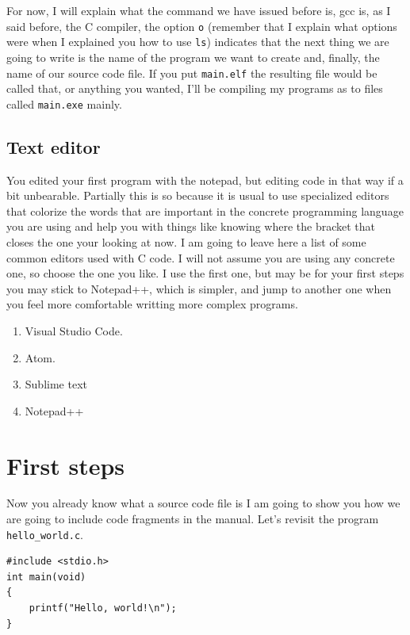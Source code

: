 \documentclass[a4paper]{article}
\begin{document}
For now, I will explain what the command we have issued before is, gcc is, as
I said before, the C compiler, the option \verb!o! (remember that I explain
what options were when I explained you how to use \verb!ls!) indicates that the
next thing we are going to write is the name of the program we want to create
and, finally, the name of our source code file. If you put \verb!main.elf! the
resulting file would be called that, or anything you wanted, I'll be compiling
my programs as to files called \verb!main.exe! mainly.

\subsection{Text editor}
You edited your first program with the notepad, but editing code in that way
if a bit unbearable. Partially this is so because it is usual to use specialized
editors that colorize the words that are important in the concrete programming
language you are using and help you with things like knowing where the bracket
that closes the one your looking at now. I am going to leave here a list of
some common editors used with C code. I will not assume you are using any
concrete one, so choose the one you like. I use the first one, but may be for
your first steps you may stick to Notepad++, which is simpler, and jump
to another one when you feel more comfortable writting more complex programs.
\begin{enumerate}
    \item Visual Studio Code.
    \item Atom.
    \item Sublime text
    \item Notepad++
\end{enumerate}

\section{First steps}

Now you already know what a source code file is I am going to show you how we
are going to include code fragments in the manual. Let's revisit the program
\verb!hello_world.c!.

\noindent
\begin{minipage}[H]{\linewidth}
\mbox{}
\begin{lstlisting}[style=C, caption={Hello World in C},
label={lst:helloWorld}]
#include <stdio.h>
int main(void)
{
    printf("Hello, world!\n");
}
\end{lstlisting}
\end{minipage}
\end{document}
